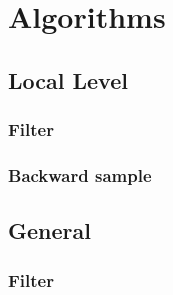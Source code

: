 
\section{Algorithms}

\subsection{Local Level}

\subsubsection{Filter}

\subsubsection{Backward sample}

\subsection{General}

\subsubsection{Filter}
